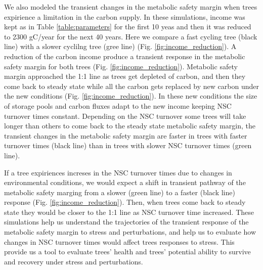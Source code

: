 \documentclass{article}
\begin{document}
We also modeled the transient changes in the metabolic safety margin when trees expirience a limitation in the carbon supply.
In these simulations, income was kept as in Table \ref{table:parameters} for the first 10 yeas and then it was reduced to 2300 gC/year for the next 40 years. 
Here we compare a fast cycling tree (black line) with a slower cyclilng tree (gree line) (Fig. \ref{fig:income_reduction}). 
A reduction of the carbon income produce a transient response in the metabolic safety margin for both trees (Fig. \ref{fig:income_reduction}). 
Metabolic safety margin approached the 1:1 line as trees get depleted of carbon, and then they come back to steady state while all the carbon gets replaced by new carbon under the new conditions (Fig. \ref{fig:income_reduction}).
In these new conditions the size of storage pools and carbon fluxes adapt to the new income keeping NSC turnover times constant. 
Depending on the NSC turnover some trees will take longer than others to come back to the steady state metabolic safety margin, the transient changes in the metabolic safety margin are faster in trees with faster turnover times (black line) than in trees with slower NSC turnover times (green line). 


If a tree expiriences increses in the NSC turnover times due to changes in environmental conditions, we would expect a shift in transient pathway of the metabolic safety marging from a slower (green line) to a faster (black line) response (Fig. \ref{fig:income_reduction}).
Then, when trees come back to steady state they would be closer to the 1:1 line as NSC turnover time increased.
These simulations help us understand the trajectories of the transient response of the metabolic safety margin to stress and perturbations, and help us to evaluate how changes in NSC turnover times would affect trees responses to stress.
This provide us a tool to evaluate trees' health and trees' potential ability to survive and recovery under stress and perturbations.  
\end{document}
